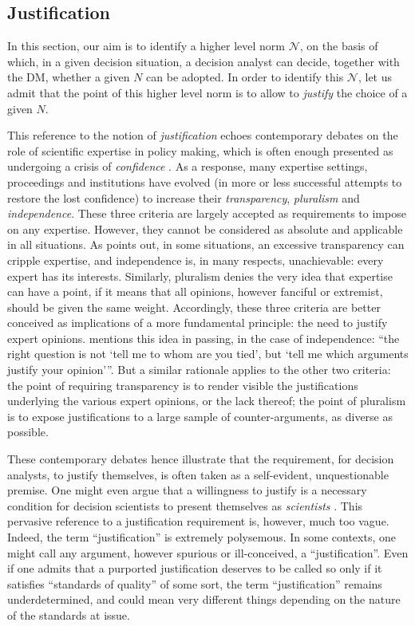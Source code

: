 \documentclass[preprint, french, english, 11pt, authoryear]{elsarticle}%
\newcommand{\adv}{\mathscr{N}}
\begin{document}
\subsection{Justification}
In this section, our aim is to identify a higher level norm $\adv$, on the basis of which, in a given decision situation, a decision analyst can decide, together with the \ac{DM}, whether a given $N$ can be adopted. In order to identify this $\adv$, let us admit that the point of this higher level norm is to allow to \emph{justify} the choice of a given $N$.

This reference to the notion of \emph{justification} echoes contemporary debates on the role of scientific expertise in policy making, which is often enough presented as undergoing a crisis of \emph{confidence} \citep{godard_environnement_2015}. As a response, many expertise settings, proceedings and institutions have evolved (in more or less successful attempts to restore the lost confidence) to increase their \emph{transparency}, \emph{pluralism} and \emph{independence}. These three criteria are largely accepted as requirements to impose on any expertise. However, they cannot be considered as absolute and applicable in all situations. As \citet{godard_environnement_2015} points out, in some situations, an excessive transparency can cripple expertise, and independence is, in many respects, unachievable: every expert has its interests. Similarly, pluralism denies the very idea that expertise can have a point, if it means that all opinions, however fanciful or extremist, should be given the same weight. Accordingly, these three criteria are better conceived as implications of a more fundamental principle: the need to justify expert opinions. \citet[][p. 379]{godard_environnement_2015} mentions this idea in passing, in the case of independence: “the right question is not `tell me to whom are you tied', but `tell me which arguments justify your opinion'”. But a similar rationale applies to the other two criteria: the point of requiring transparency is to render visible the justifications underlying the various expert opinions, or the lack thereof; the point of pluralism is to expose justifications to a large sample of counter-arguments, as diverse as possible.

These contemporary debates hence illustrate that the requirement, for decision analysts, to justify themselves, is often taken as a self-evident, unquestionable premise. One might even argue that a willingness to justify is a necessary condition for decision scientists to present themselves as \emph{scientists} \citep{ormerod_justifying_2010}. This pervasive reference to a justification requirement is, however, much too vague. Indeed, the term ``justification'' is extremely polysemous. In some contexts, one might call any argument, however spurious or ill-conceived, a ``justification''. Even if one admits that a purported justification deserves to be called so only if it satisfies ``standards of quality'' of some sort, the term ``justification'' remains underdetermined, and could mean very different things depending on the nature of the standards at issue.
\end{document}

